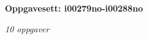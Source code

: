 \centerline{\bf Oppgavesett: i00279no-i00288no}
\vskip 10pt
\centerline{\it 10 oppgaver}\vskip 10pt
\vskip 10pt
